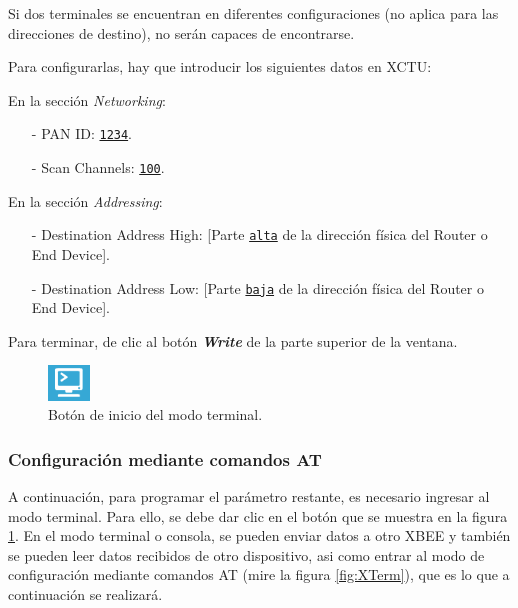 Si dos terminales se encuentran en diferentes configuraciones (no aplica para las direcciones de destino), no serán capaces de encontrarse.

Para configurarlas, hay que introducir los siguientes datos en XCTU: 

En la sección \textit{Networking}:
\begin{itemize}
	\item[-] PAN ID: \texttt{\underline{1234}}.
	\item[-] Scan Channels: \texttt{\underline{100}}.
\end{itemize}

En la sección \textit{Addressing}:
\begin{itemize}
	\item[-] Destination Address High: [Parte \texttt{\underline{alta}} de la dirección física del 
	Router o End Device].
	\item[-] Destination Address Low: [Parte \texttt{\underline{baja}} de la dirección física del 
	Router o End Device].
\end{itemize}

Para terminar, de clic al botón \textit{\textbf{Write}} de la parte superior de la ventana.

\begin{figure} %
    \centering
    \includegraphics[width=0.10\textwidth]{Figures/XCTU/Console}
    \caption{Botón de inicio del modo terminal.}
    \label{fig:Term}
\end{figure}

\subsubsection{Configuración mediante comandos AT}\label{subsubsec:ConCoor}

A continuación, para programar el parámetro restante, es necesario ingresar al modo terminal. Para ello, se debe dar clic en el botón que se muestra en la figura \ref{fig:Term}. En el modo terminal o consola, se pueden enviar datos a otro XBEE y también se pueden leer datos recibidos de otro dispositivo, asi como entrar al modo de configuración mediante comandos AT (mire la figura \ref{fig:XTerm}), que es lo que a continuación se realizará.  

